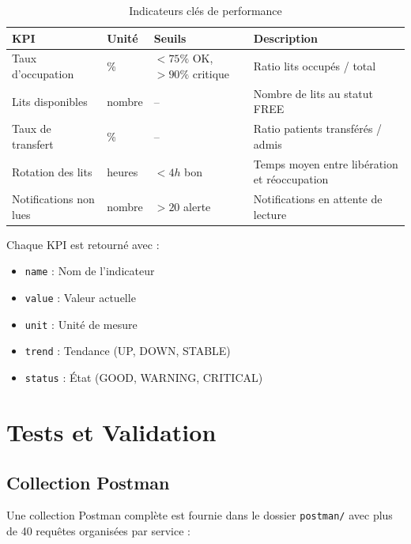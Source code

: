 \documentclass[12pt,a4paper]{report}
\begin{document}
\begin{table}[H]
    \centering
    \begin{tabularx}{\textwidth}{lllX}
        \toprule
        \textbf{KPI} & \textbf{Unit\'e} & \textbf{Seuils} & \textbf{Description} \\
        \midrule
        Taux d'occupation & \% & $<75\%$ OK, $>90\%$ critique & Ratio lits occup\'es / total \\
        Lits disponibles & nombre & -- & Nombre de lits au statut FREE \\
        Taux de transfert & \% & -- & Ratio patients transf\'er\'es / admis \\
        Rotation des lits & heures & $<4h$ bon & Temps moyen entre lib\'eration et r\'eoccupation \\
        Notifications non lues & nombre & $>20$ alerte & Notifications en attente de lecture \\
        \bottomrule
    \end{tabularx}
    \caption{Indicateurs cl\'es de performance}
\end{table}

Chaque KPI est retourn\'e avec :
\begin{itemize}
    \item \texttt{name} : Nom de l'indicateur
    \item \texttt{value} : Valeur actuelle
    \item \texttt{unit} : Unit\'e de mesure
    \item \texttt{trend} : Tendance (UP, DOWN, STABLE)
    \item \texttt{status} : \'Etat (GOOD, WARNING, CRITICAL)
\end{itemize}

\chapter{Tests et Validation}

\section{Collection Postman}

Une collection Postman compl\`ete est fournie dans le dossier \texttt{postman/} avec plus de 40 requ\^etes organis\'ees par service :
\end{document}
